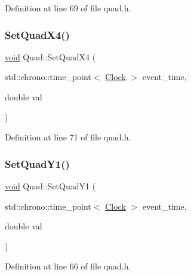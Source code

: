 Definition at line 69 of file quad.\+h.

\mbox{\label{class_quad_ac49d711fa31a12ba24ad65c959c74e05}} 
\subsubsection{\texorpdfstring{Set\+Quad\+X4()}{SetQuadX4()}}
{\footnotesize\ttfamily \mbox{\hyperlink{glad_8h_a950fc91edb4504f62f1c577bf4727c29}{void}} Quad\+::\+Set\+Quad\+X4 (\begin{DoxyParamCaption}\item[{std\+::chrono\+::time\+\_\+point$<$ \mbox{\hyperlink{universe_8h_a0ef8d951d1ca5ab3cfaf7ab4c7a6fd80}{Clock}} $>$}]{event\+\_\+time,  }\item[{double}]{val }\end{DoxyParamCaption})\hspace{0.3cm}{\ttfamily [inline]}}



Definition at line 71 of file quad.\+h.

\mbox{\label{class_quad_a3f0f9162be2b1ec2e2597a163586fb01}} 
\subsubsection{\texorpdfstring{Set\+Quad\+Y1()}{SetQuadY1()}}
{\footnotesize\ttfamily \mbox{\hyperlink{glad_8h_a950fc91edb4504f62f1c577bf4727c29}{void}} Quad\+::\+Set\+Quad\+Y1 (\begin{DoxyParamCaption}\item[{std\+::chrono\+::time\+\_\+point$<$ \mbox{\hyperlink{universe_8h_a0ef8d951d1ca5ab3cfaf7ab4c7a6fd80}{Clock}} $>$}]{event\+\_\+time,  }\item[{double}]{val }\end{DoxyParamCaption})\hspace{0.3cm}{\ttfamily [inline]}}



Definition at line 66 of file quad.\+h.

\mbox{\label{class_quad_afcec579c40a3763c34d1ace417888bf9}} 

